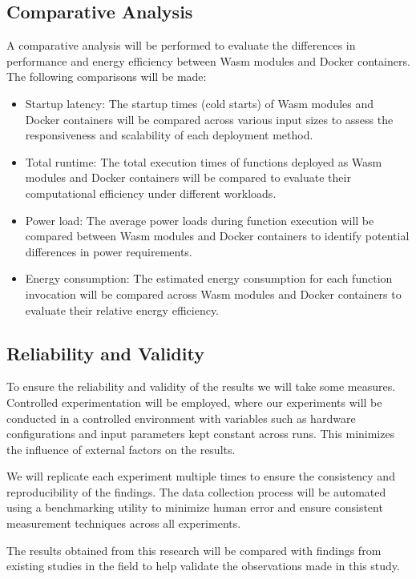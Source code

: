 \documentclass[
  table]{report}
\begin{document}
\subsection{Comparative Analysis}
\label{sect:comp_anal}

A comparative analysis will be performed to evaluate the differences in
performance and energy efficiency between Wasm modules and Docker
containers. The following comparisons will be made:

\begin{itemize}
\item
  Startup latency: The startup times (cold starts) of Wasm modules and
  Docker containers will be compared across various input sizes to
  assess the responsiveness and scalability of each deployment method.
\item
  Total runtime: The total execution times of functions deployed as Wasm
  modules and Docker containers will be compared to evaluate their
  computational efficiency under different workloads.
\item
  Power load: The average power loads during function execution will be
  compared between Wasm modules and Docker containers to identify
  potential differences in power requirements.
\item
  Energy consumption: The estimated energy consumption for each function
  invocation will be compared across Wasm modules and Docker containers
  to evaluate their relative energy efficiency.
\end{itemize}

\subsection{Reliability and Validity}

To ensure the reliability and validity of the results we will take some
measures. Controlled experimentation will be employed, where our
experiments will be conducted in a controlled environment with variables
such as hardware configurations and input parameters kept constant
across runs. This minimizes the influence of external factors on the
results.

We will replicate each experiment multiple times to ensure the
consistency and reproducibility of the findings. The data collection
process will be automated using a benchmarking utility to minimize human
error and ensure consistent measurement techniques across all
experiments.

The results obtained from this research will be compared with findings
from existing studies in the field to help validate the observations
made in this study.
\end{document}
